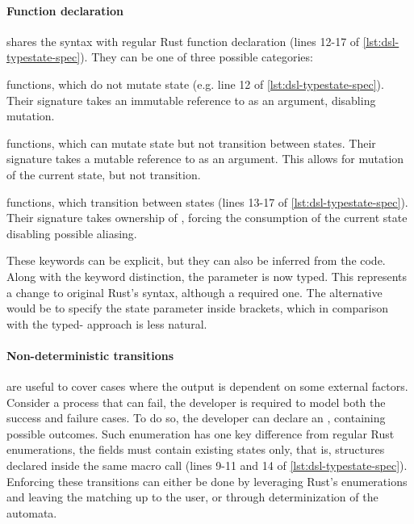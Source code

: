 \paragraph{Function declaration} shares the syntax with regular Rust function declaration (lines 12-17 of \autoref{lst:dsl-typestate-spec}).
They can be one of three possible categories:
\begin{compactitem}
    \item {} functions, which do not mutate state (e.g. line 12 of \autoref{lst:dsl-typestate-spec}).
    Their signature takes an immutable reference to  as an argument,
    disabling mutation.
    \item {} functions, which can mutate state but not transition between states.
    Their signature takes a mutable reference to  as an argument.
    This allows for mutation of the current state, but not transition.
    \item {} functions, which transition between states (lines 13-17 of \autoref{lst:dsl-typestate-spec}).
    Their signature takes ownership of ,
    forcing the consumption of the current state disabling possible aliasing.
\end{compactitem}
These keywords can be explicit, but they can also be inferred from the code.
Along with the keyword distinction, the  parameter is now typed.
This represents a change to original Rust's syntax, although a required one.
The alternative would be to specify the state parameter inside brackets,
which in comparison with the typed- approach is less natural.

\paragraph{Non-deterministic transitions} are useful to cover cases where the output is dependent on some external factors.
Consider a process that can fail, the developer is required to model both the success and failure cases.
To do so, the developer can declare an , containing possible outcomes.
Such enumeration has one key difference from regular Rust enumerations, the fields must contain existing states only,
that is, structures declared inside the same macro call (lines 9-11 and 14 of \autoref{lst:dsl-typestate-spec}).
Enforcing these transitions can either be done by leveraging Rust's enumerations and leaving the matching up to the user,
or through determinization of the automata.

